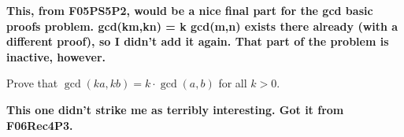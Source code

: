 \documentclass[handout]{mcs}
\begin{document}







\large\textbf{This, from F05PS5P2, would be a nice final part for the gcd basic proofs problem.
gcd(km,kn) = k gcd(m,n) exists there already (with a different proof), so I 
didn't add it again.  That part of the problem is inactive, however.}

\begin{problem}
Prove that $\gcd(ka, kb) = k \cdot \gcd(a, b)$ for all $k > 0$.

\end{problem}


\large\textbf{This one didn't strike me as terribly interesting.  Got it from F06Rec4P3.}
\end{document}
